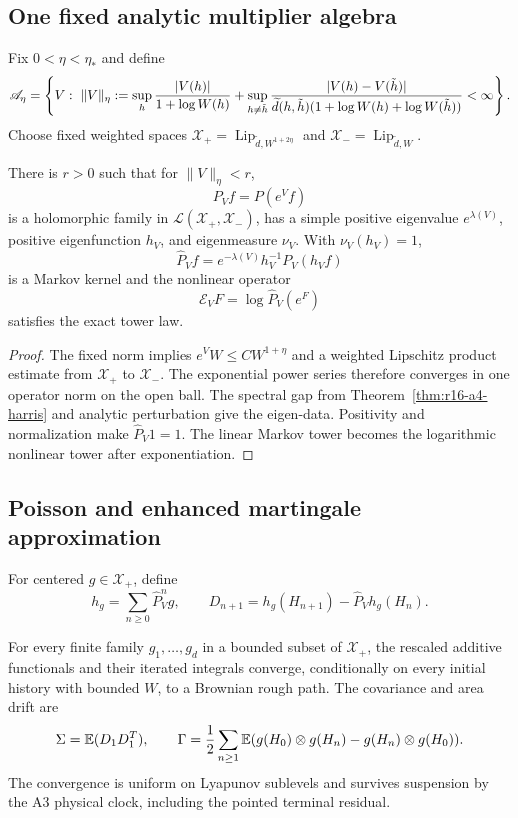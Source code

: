 \subsection{One fixed analytic multiplier algebra}

Fix \(0<\eta<\eta_*\) and define
\[
 \mathscr A_\eta=
 \left\{V:\ 
 \|V\|_\eta:=\sup_h{|V(h)|\over1+\log W(h)}
 +\sup_{h\ne\tilde h}{|V(h)-V(\tilde h)|
  \over\widetilde d(h,\tilde h)(1+\log W(h)+\log W(\tilde h))}<\infty
 \right\}.
\]
Choose fixed weighted spaces
\(\mathcal X_+=\operatorname{Lip}_{\widetilde d,W^{1+2\eta}}\) and
\(\mathcal X_-=\operatorname{Lip}_{\widetilde d,W}\).

\begin{theorem}
\label{thm:r16-a4-fk}
There is \(r>0\) such that for \(\|V\|_\eta<r\),
\[
 P_Vf=P(e^Vf)
\]
is a holomorphic family in
\(\mathcal L(\mathcal X_+,\mathcal X_-)\), has a simple positive eigenvalue
\(e^{\lambda(V)}\), positive eigenfunction \(h_V\), and eigenmeasure
\(\nu_V\).  With \(\nu_V(h_V)=1\),
\[
 \widehat P_Vf=e^{-\lambda(V)}h_V^{-1}P_V(h_Vf)
\]
is a Markov kernel and the nonlinear operator
\[
 \mathcal E_VF=\log\widehat P_V(e^F)
\]
satisfies the exact tower law.
\end{theorem}

\begin{proof}
The fixed norm implies
\(e^V W\le C W^{1+\eta}\) and a weighted Lipschitz product estimate from
\(\mathcal X_+\) to \(\mathcal X_-\).  The exponential power series therefore
converges in one operator norm on the open ball.  The spectral gap from
Theorem~\ref{thm:r16-a4-harris} and analytic perturbation give the eigen-data.
Positivity and normalization make \(\widehat P_V1=1\).  The linear Markov
tower becomes the logarithmic nonlinear tower after exponentiation.
\end{proof}

\subsection{Poisson and enhanced martingale approximation}

For centered \(g\in\mathcal X_+\), define
\[
 h_g=\sum_{n\ge0}\widehat P_V^ng,
 \qquad
 D_{n+1}=h_g(H_{n+1})-
          \widehat P_Vh_g(H_n).
\]

\begin{theorem}
\label{thm:r16-a4-rough}
For every finite family \(g_1,\ldots,g_d\) in a bounded subset of
\(\mathcal X_+\), the rescaled additive functionals and their iterated
integrals converge, conditionally on every initial history with bounded
\(W\), to a Brownian rough path.  The covariance and area drift are
\[
 \Sigma=\mathbb E(D_1D_1^T),
 \qquad
 \Gamma={1\over2}
 \sum_{n\ge1}
 \mathbb E(g(H_0)\otimes g(H_n)-g(H_n)\otimes g(H_0)).
\]
The convergence is uniform on Lyapunov sublevels and survives suspension by
the A3 physical clock, including the pointed terminal residual.
\end{theorem}

